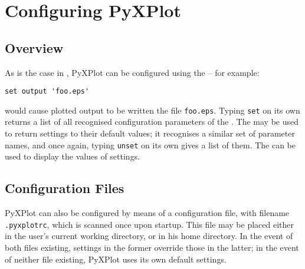 %
%
%
%
%



\chapter{Configuring PyXPlot}
\label{ch:configuration}

\section{Overview}

As is the case in \gnuplot, PyXPlot can be configured using the 
-- for example:

\begin{verbatim}set output 'foo.eps'\end{verbatim}

\noindent would cause plotted output to be written the file {\tt foo.eps}.
Typing {\tt set} on its own returns a list of all recognised configuration
parameters of the . The  may be used to return
settings to their default values; it recognises a similar set of parameter
names, and once again, typing {\tt unset} on its own gives a list of them. The
 can be used to display the values of settings.

\section{Configuration Files}

PyXPlot can also be configured by means of a configuration file, with filename
{\tt .pyxplotrc}, which is scanned once upon startup. This file may be
placed either in the user's current working directory, or in his home
directory. In the event of both files existing, settings in the former override
those in the latter; in the event of neither file existing, PyXPlot uses its
own default settings.

